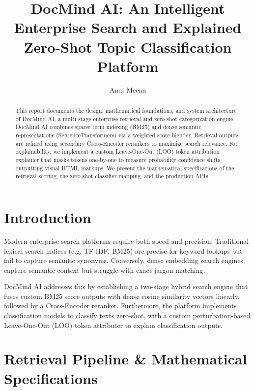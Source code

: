 \documentclass[11pt,journal,onecolumn]{IEEEtran}
\begin{document}
\title{DocMind AI: An Intelligent Enterprise Search and Explained Zero-Shot Topic Classification Platform}
\author{Anuj Meena}
\maketitle

\begin{abstract}
This report documents the design, mathematical foundations, and system architecture of DocMind AI, a multi-stage enterprise retrieval and zero-shot categorization engine. DocMind AI combines sparse term indexing (BM25) and dense semantic representations (SentenceTransformers) via a weighted score blender. Retrieval outputs are refined using secondary Cross-Encoder rerankers to maximize search relevance. For explainability, we implement a custom Leave-One-Out (LOO) token attribution explainer that masks tokens one-by-one to measure probability confidence shifts, outputting visual HTML markups. We present the mathematical specifications of the retrieval scoring, the zero-shot classifier mapping, and the production APIs.
\end{abstract}

\section{Introduction}
Modern enterprise search platforms require both speed and precision. Traditional lexical search indices (e.g. TF-IDF, BM25) are precise for keyword lookups but fail to capture semantic synonyms. Conversely, dense embedding search engines capture semantic context but struggle with exact jargon matching.

DocMind AI addresses this by establishing a two-stage hybrid search engine that fuses custom BM25 score outputs with dense cosine similarity vectors linearly, followed by a Cross-Encoder reranker. Furthermore, the platform implements classification models to classify texts zero-shot, with a custom perturbation-based Leave-One-Out (LOO) token attributer to explain classification outputs.

\section{Retrieval Pipeline \& Mathematical Specifications}
\end{document}

